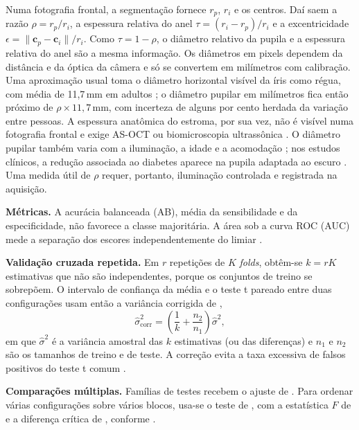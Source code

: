 Numa fotografia frontal, a segmentação fornece $r_p$, $r_i$ e os centros. Daí
saem a razão $\rho=r_p/r_i$, a espessura relativa do anel
$\tau=(r_i-r_p)/r_i$ e a excentricidade
$\epsilon=\lVert\mathbf{c}_p-\mathbf{c}_i\rVert/r_i$. Como $\tau=1-\rho$, o
diâmetro relativo da pupila e a espessura relativa do anel são a mesma
informação. Os diâmetros em pixels dependem da distância e da óptica da
câmera e só se convertem em milímetros com calibração. Uma aproximação usual
toma o diâmetro horizontal visível da íris como régua, com média de
11,7\,mm em adultos \citep*{Rufer2005}; o diâmetro pupilar em milímetros fica
então próximo de $\rho\times 11{,}7$\,mm, com incerteza de alguns por cento
herdada da variação entre pessoas. A espessura anatômica do estroma, por sua
vez, não é visível numa fotografia frontal e exige AS-OCT ou biomicroscopia
ultrassônica \citep*{Cui2024}. O diâmetro pupilar também varia com a
iluminação, a idade e a acomodação \citep*{WatsonYellott2012}; nos estudos
clínicos, a redução associada ao diabetes aparece na pupila adaptada ao
escuro \citep*{Cahill2001}. Uma medida útil de $\rho$ requer, portanto,
iluminação controlada e registrada na aquisição.

\label{sec:estatistica}

\textbf{Métricas.} A acurácia balanceada (AB), média da sensibilidade e da
especificidade, não favorece a classe majoritária. A área sob a curva ROC
(AUC) mede a separação dos escores independentemente do limiar
\citep*{HanleyMcNeil1982,Fawcett2006}.

\textbf{Validação cruzada repetida.} Em $r$ repetições de $K$
\emph{folds}, obtêm-se $k=rK$ estimativas que não são independentes, porque
os conjuntos de treino se sobrepõem. O intervalo de confiança da média e o
teste t pareado entre duas configurações usam então a variância corrigida de
\citet{NadeauBengio2003},
\begin{equation}
  \hat\sigma^2_{\text{corr}}=\left(\frac{1}{k}+\frac{n_2}{n_1}\right)\hat\sigma^2,
\end{equation}
em que $\hat\sigma^2$ é a variância amostral das $k$ estimativas (ou das
diferenças) e $n_1$ e $n_2$ são os tamanhos de treino e de teste. A correção
evita a taxa excessiva de falsos positivos do teste t comum
\citep*{BouckaertFrank2004}.

\textbf{Comparações múltiplas.} Famílias de testes recebem o ajuste de
\citet{Holm1979}. Para ordenar várias configurações sobre vários blocos, usa-se
o teste de \citet{Friedman1937}, com a estatística $F$ de
\citet{ImanDavenport1980} e a diferença crítica de \citet{Nemenyi1963},
conforme \citet{Demsar2006}.

